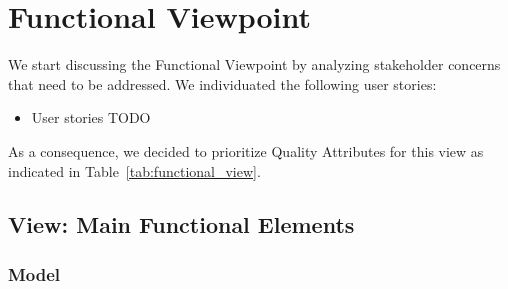 \section{Functional Viewpoint}

We start discussing the Functional Viewpoint by analyzing stakeholder concerns that need to be addressed.
We individuated the following user stories:
\begin{itemize}
    \item User stories TODO
\end{itemize}

As a consequence, we decided to prioritize Quality Attributes for this view as indicated in Table~\ref{tab:functional_view}.
\begin{table}[h!]
    \centering
    \caption{Functional View Prioritized Quality Attributes}
    \label{tab:functional_view}
\end{table}


\subsection{View: Main Functional Elements}

\subsubsection{Model}

